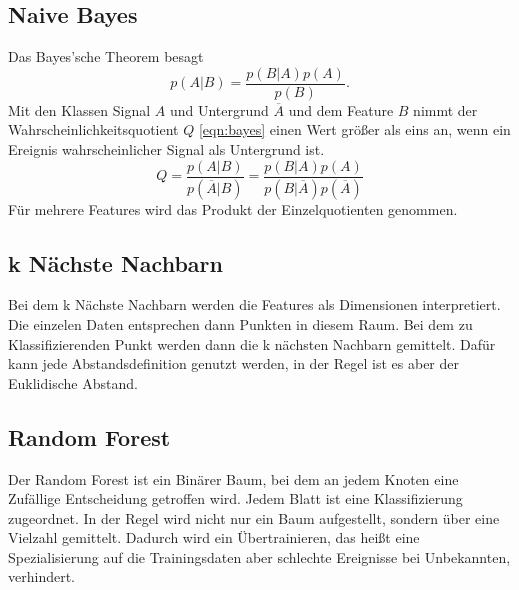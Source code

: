 \subsection{Naive Bayes}
Das Bayes'sche Theorem besagt
\begin{equation}
	p(A|B)=\frac{p(B|A)p(A)}{p(B)}.
\end{equation}
Mit den Klassen Signal $A$ und Untergrund $\overline{A}$ und dem Feature $B$ nimmt der Wahrscheinlichkeitsquotient $Q$ \eqref{eqn:bayes} einen Wert größer als
eins an, wenn ein Ereignis wahrscheinlicher Signal als Untergrund ist.
\begin{equation}
	Q=\frac{p(A|B)}{p(\overline{A}|B)} = \frac{p(B|A)p(A)}{p(B|\overline{A})p(\overline{A})}
	\label{eqn:bayes}
\end{equation}
Für mehrere Features wird das Produkt der Einzelquotienten genommen.
\subsection{k Nächste Nachbarn}
Bei dem k Nächste Nachbarn werden die Features als Dimensionen interpretiert. Die einzelen Daten entsprechen dann Punkten in diesem Raum. Bei dem zu
Klassifizierenden Punkt werden dann die k nächsten Nachbarn gemittelt. Dafür kann jede Abstandsdefinition genutzt werden, in der Regel ist es aber der
Euklidische Abstand.
\subsection{Random Forest}
Der Random Forest ist ein Binärer Baum, bei dem an jedem Knoten eine Zufällige Entscheidung getroffen wird. Jedem Blatt ist eine Klassifizierung zugeordnet.
In der Regel wird nicht nur ein Baum aufgestellt, sondern über eine Vielzahl gemittelt. Dadurch wird ein Übertrainieren, das heißt eine Spezialisierung auf die
Trainingsdaten aber schlechte Ereignisse bei Unbekannten, verhindert.
